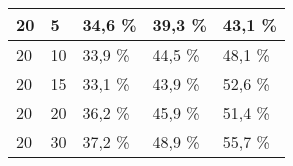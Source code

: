 \begin{table}[!htb]
\begin{tabular}{lllll}
\multicolumn{1}{|l|}{20}                                                     & \multicolumn{1}{l|}{5}                                                                 & \multicolumn{1}{l|}{34,6 \%}                                                                                           & \multicolumn{1}{l|}{39,3 \%}                                                                                            & \multicolumn{1}{l|}{43,1 \%}                                                                                            \\ \hline
\multicolumn{1}{|l|}{20}                                                     & \multicolumn{1}{l|}{10}                                                                & \multicolumn{1}{l|}{33,9 \%}                                                                                           & \multicolumn{1}{l|}{44,5 \%}                                                                                            & \multicolumn{1}{l|}{48,1 \%}                                                                                            \\ \hline
\multicolumn{1}{|l|}{20}                                                     & \multicolumn{1}{l|}{15}                                                                & \multicolumn{1}{l|}{33,1 \%}                                                                                           & \multicolumn{1}{l|}{43,9 \%}                                                                                            & \multicolumn{1}{l|}{52,6 \%}                                                                                            \\ \hline
\multicolumn{1}{|l|}{20}                                                     & \multicolumn{1}{l|}{20}                                                                & \multicolumn{1}{l|}{36,2 \%}                                                                                           & \multicolumn{1}{l|}{45,9 \%}                                                                                            & \multicolumn{1}{l|}{51,4 \%}                                                                                            \\ \hline
\multicolumn{1}{|l|}{20}                                                     & \multicolumn{1}{l|}{30}                                                                & \multicolumn{1}{l|}{37,2 \%}                                                                                           & \multicolumn{1}{l|}{48,9 \%}                                                                                            & \multicolumn{1}{l|}{55,7 \%}                                                                                            \\ \hline

\end{tabular}
\end{table}
